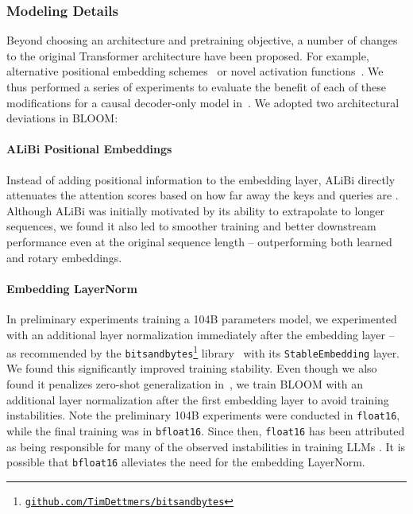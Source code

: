 \documentclass[twoside,11pt]{article}
\begin{document}
\subsubsection{Modeling Details}

Beyond choosing an architecture and pretraining objective, a number of changes to the original Transformer architecture have been proposed. For example, alternative positional embedding schemes~\citep{su2021roformer, press2021train} or novel activation functions~\citep{shazeer2020glu}. We thus performed a series of experiments to evaluate the benefit of each of these modifications for a causal decoder-only model in~\citet{scao2022what}. We adopted two architectural deviations in BLOOM:

\paragraph{ALiBi Positional Embeddings} Instead of adding positional information to the embedding layer, ALiBi directly attenuates the attention scores based on how far away the keys and queries are \citep{press2021train}. Although ALiBi was initially motivated by its ability to extrapolate to longer sequences, we found it also led to smoother training and better downstream performance even at the original sequence length -- outperforming both learned \citep{vaswani2017attention} and rotary \citep{su2021roformer} embeddings.

\paragraph{Embedding LayerNorm} In preliminary experiments training a 104B parameters model, we experimented with an additional layer normalization immediately after the embedding layer -- as recommended by the \texttt{bitsandbytes}\footnote{\href{https://github.com/TimDettmers/bitsandbytes}{\texttt{github.com/TimDettmers/bitsandbytes}}} library~\citep{dettmers2022llm} with its \texttt{StableEmbedding} layer. We found this significantly improved training stability. Even though we also found it penalizes zero-shot generalization in~\citet{scao2022what}, we train BLOOM with an additional layer normalization after the first embedding layer to avoid training instabilities.
Note the preliminary 104B experiments were conducted in \texttt{float16}, while the final training was in \texttt{bfloat16}. Since then, \texttt{float16} has been attributed as being responsible for many of the observed instabilities in training LLMs \citep{zhang2022opt, zeng2022glm}. It is possible that \texttt{bfloat16} alleviates the need for the embedding LayerNorm.
\end{document}
